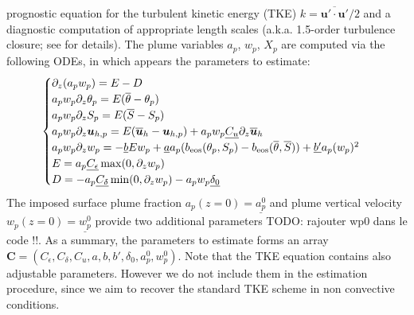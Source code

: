 \documentclass[draft]{agujournal2019}
\newcommand{\parenthese}[1]{\ensuremath{\left(#1\right)}} %
\newcommand{\blu}[1]{{\color{BlueGreen} #1}}
\begin{document}
prognostic equation for the turbulent kinetic energy (TKE) 
$\displaystyle k = \overline{{\bm u}' \cdot {\bm u}'} / 2$ and a diagnostic 
computation of appropriate length scales (a.k.a. 1.5-order turbulence closure; see  for details). The plume variables $a_p$, $w_p$, $X_p$ are computed via the following ODEs, in which appears the parameters to estimate:
%
\begin{eqnarray*}
    \begin{cases}
        \partial_z (a_p w_p) = E-D
        \\
        a_p w_p \partial_z \theta_p = E (\overline{\theta} - \theta_p)
        \\
        a_p w_p \partial_z S_p = E (\overline{S} - S_p)   
        \\
        a_p w_p \partial_z \bm u_{h,p} = E (\overline{\bm u}_h - \bm u_{h,p}) + a_p w_p \underline{C_u} \partial_z   \overline{\bm u}_h 
        \\
        a_p w_p \partial_z w_p = - \underline{b} E w_p + \underline{a} a_p (b_{\rm{eos}}(\theta_p, S_p) - b_{\rm{eos}}(\overline{\theta},\overline{S}) ) +\underline{ b'} a_p (w_p)^2 
        \\
        E = a_p \underline{C_{\epsilon}} \max (0,\partial_z w_p)
        \\
        D = -a_p \underline{C_{\delta}} \min (0,\partial_z w_p) - a_p w_p \underline{\delta_0}
    \end{cases}
\end{eqnarray*}
%
The imposed surface plume fraction $a_p(z=0)=\underline{a_p^0}$ and plume vertical velocity $w_p(z=0) = \underline{w_p^0}$ provide two additional parameters \blu{TODO: rajouter wp0 dans le code !!}. As a summary, the parameters to estimate forms an array $\bm C = (C_\epsilon, C_\delta, C_u, a, b, b', \delta_0, a_p^0, w_p^0)$. Note that the TKE equation contains also adjustable parameters. However we do not include them in the estimation procedure, since we aim to recover the standard TKE scheme in non convective conditions.  


\end{document}
